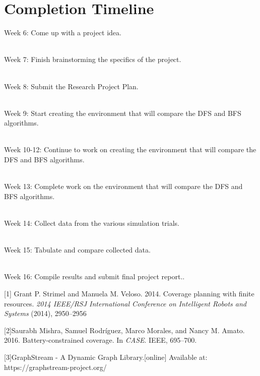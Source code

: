 \documentclass{article}
\begin{document}
\section{Completion Timeline}
Week 6: Come up with a project idea.

\
\\Week 7: Finish brainstorming the specifics of the project.

\
\\Week 8: Submit the Research Project Plan.

\
\\Week 9: Start creating the environment that will compare the DFS and BFS algorithms.

\
\\Week 10-12: Continue to work on creating the environment that will compare the DFS and BFS algorithms.

\
\\Week 13: Complete work on the environment that will compare the DFS and BFS algorithms.

\
\\Week 14: Collect data from the various simulation trials.

\
\\Week 15: Tabulate and compare collected data.

\
\\Week 16: Compile results and submit final project report..




[1] Grant P. Strimel and Manuela M. Veloso. 2014. Coverage planning with finite
resources. \textit{2014 IEEE/RSJ International Conference on Intelligent Robots and Systems}
(2014), 2950–2956

[2]Saurabh Mishra, Samuel Rodríguez, Marco Morales, and Nancy M. Amato. 2016. Battery-constrained coverage. In \textit{CASE}. IEEE, 695–700.

[3]GraphStream - A Dynamic Graph Library.[online] Available at: https://graphstream-project.org/
\end{document}
